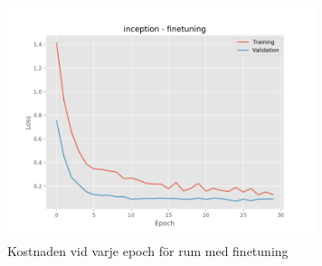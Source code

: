 \documentclass[]{kththesis}
\begin{document}
\begin{figure}[h]
    \includegraphics[width=9cm]{r_l_inception_fine}
    \caption{Kostnaden vid varje epoch för rum med finetuning}
    \label{fig:r_l_2}
  \end{figure}
  
\end{document}
